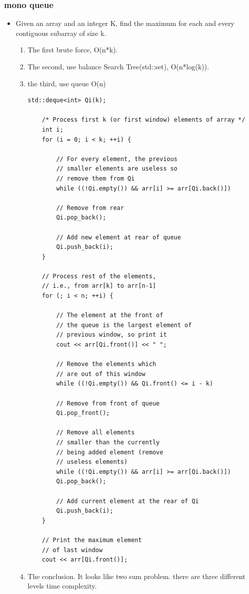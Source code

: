 \documentclass[a4paper,11pt,twoside]{book}
\begin{document}
\subsubsection{mono queue}
\begin{itemize}
	\item Given an array and an integer K, find the maximum for each and every contiguous subarray of size k.
\begin{enumerate}
	\item The first brute force, O(n*k). 
	\item The second, use balance Search Tree(std::set), O(n*log(k)). 
	\item the third, use queue O(n)
\begin{lstlisting}[breaklines]
    std::deque<int> Qi(k);

	/* Process first k (or first window) elements of array */
	int i;
	for (i = 0; i < k; ++i) {
		
		// For every element, the previous
		// smaller elements are useless so
		// remove them from Qi
		while ((!Qi.empty()) && arr[i] >= arr[Qi.back()])
		
		// Remove from rear
		Qi.pop_back();
		
		// Add new element at rear of queue
		Qi.push_back(i);
	}

	// Process rest of the elements, 
	// i.e., from arr[k] to arr[n-1]
	for (; i < n; ++i) {
		
		// The element at the front of 
		// the queue is the largest element of
		// previous window, so print it
		cout << arr[Qi.front()] << " ";
		
		// Remove the elements which 
		// are out of this window
		while ((!Qi.empty()) && Qi.front() <= i - k)
		
		// Remove from front of queue
		Qi.pop_front(); 
		
		// Remove all elements 
		// smaller than the currently
		// being added element (remove 
		// useless elements)
		while ((!Qi.empty()) && arr[i] >= arr[Qi.back()])
		Qi.pop_back();
		
		// Add current element at the rear of Qi
		Qi.push_back(i);
	}

	// Print the maximum element 
	// of last window
	cout << arr[Qi.front()];	
\end{lstlisting}	
	
	\item The conclusion. It looks like two sum problem. there are three different levels time complexity. 
\end{enumerate}

	
\end{itemize}
\end{document}
